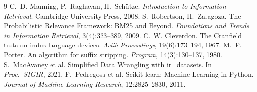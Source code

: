 \documentclass[10pt,a4paper]{article}
\begin{document}
\begin{thebibliography}{9}
  \small
  \setlength{\itemsep}{0pt}
   C.~D. Manning, P.~Raghavan, H.~Schütze. \emph{Introduction to Information Retrieval}. Cambridge University Press, 2008.
   S.~Robertson, H.~Zaragoza. The Probabilistic Relevance Framework: BM25 and Beyond. \emph{Foundations and Trends in Information Retrieval}, 3(4):333--389, 2009.
   C.~W. Cleverdon. The Cranfield tests on index language devices. \emph{Aslib Proceedings}, 19(6):173--194, 1967.
   M.~F. Porter. An algorithm for suffix stripping. \emph{Program}, 14(3):130--137, 1980.
   S.~MacAvaney et al. Simplified Data Wrangling with ir\_datasets. In \emph{Proc.\ SIGIR}, 2021.
   F.~Pedregosa et al. Scikit-learn: Machine Learning in Python. \emph{Journal of Machine Learning Research}, 12:2825--2830, 2011.
\end{thebibliography}
\end{document}
